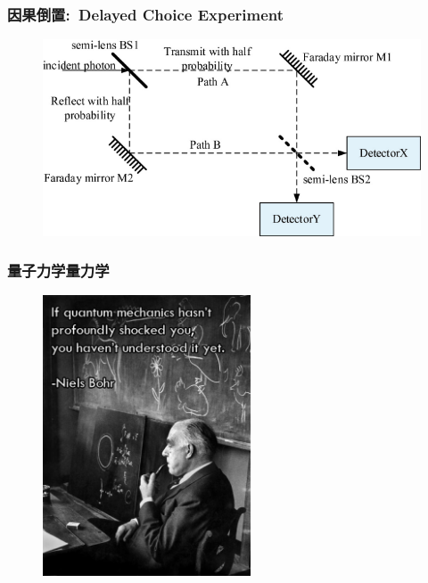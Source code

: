 \frame
{
	\frametitle{因果倒置:~\textrm{Delayed Choice Experiment}}
\begin{figure}[h!]
\centering
\vspace{-10.5pt}
\includegraphics[height=0.55\textwidth,width=1.0\textwidth,viewport=0 0 690 370,clip]{Figures/Schematic-diagram-of-delayed_choice-experiment.png}
\caption{\fontsize{5.2pt}{3.9pt}}
\label{Delayed_Choice-Experiment}
\end{figure}
}

\frame
{
	\frametitle{量子力学量力学}
\begin{figure}[h!]
\centering
\vspace{-13.5pt}
\includegraphics[height=0.75\textwidth,width=0.55\textwidth,viewport=0 0 500 650,clip]{Figures/Quote-Niels_Bohr-on-Quantum_mechanics.png}
\caption{\fontsize{5.2pt}{3.9pt}}
\label{Quote-Niels_Bohr}
\end{figure}
}

